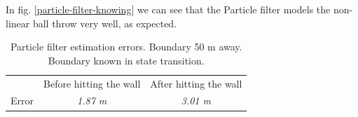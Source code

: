 \documentclass[conference]{IEEEtran}
\begin{document}
In fig. \ref{particle-filter-knowing} we can see that the Particle filter models the non-linear ball throw very well, as expected.
\begin{table}[htbp]
    \caption{Particle filter estimation errors. Boundary 50 m away. Boundary known in state transition.}
    \begin{center}
    \begin{tabular}{|c|c|c|}
    \cline{1-3}
    & Before hitting the wall & After hitting the wall \\
    \cline{1-3} 
    Error & \textit{1.87 m} & \textit{3.01 m} \\
    \hline
    \end{tabular}
    \label{tab1}
    \end{center}
\end{table}
\end{document}
